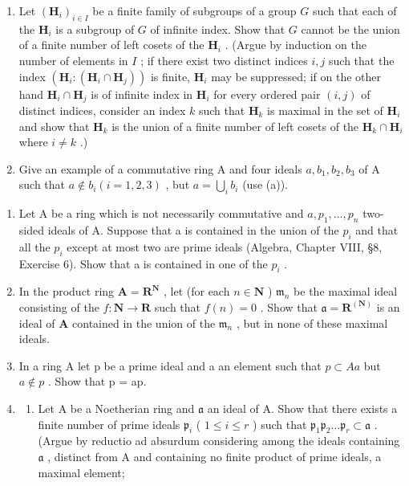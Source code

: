 \begin{enumerate}
\def\labelenumi{(\alph{enumi})}
\setcounter{enumi}{1}
\item
  Let \((\mathbf{H}_i)_{i\in I}\) be a finite family of subgroups of a group \(G\) such that each of the \(\mathbf{H}_i\) is a subgroup of \(G\) of infinite index. Show that \(G\) cannot be the union of a finite number of left cosets of the \(\mathbf{H}_i\) . (Argue by induction on the number of elements in \(I\) ; if there exist two distinct indices \(i,j\) such that the index \((\mathbf{H}_i:(\mathbf{H}_i\cap \mathbf{H}_j))\) is finite, \(\mathbf{H}_i\) may be suppressed; if on the other hand \(\mathbf{H}_i\cap \mathbf{H}_j\) is of infinite index in \(\mathbf{H}_i\) for every ordered pair \((i,j)\) of distinct indices, consider an index \(k\) such that \(\mathbf{H}_k\) is maximal in the set of \(\mathbf{H}_i\) and show that \(\mathbf{H}_k\) is the union of a finite number of left cosets of the \(\mathbf{H}_k\cap \mathbf{H}_i\) where \(i\neq k\) .)
\item
  Give an example of a commutative ring A and four ideals \(a, b_{1}, b_{2}, b_{3}\) of A such that \(a \notin b_{i} (i = 1, 2, 3)\) , but \(a = \bigcup_{i} b_{i}\) (use (a)).
\end{enumerate}

\begin{enumerate}
\def\labelenumi{\arabic{enumi}.}
\setcounter{enumi}{1}
\item
  Let A be a ring which is not necessarily commutative and \(a, p_{1}, \ldots, p_{n}\) two-sided ideals of A. Suppose that a is contained in the union of the \(p_{i}\) and that all the \(p_{i}\) except at most two are prime ideals (Algebra, Chapter VIII, §8, Exercise 6). Show that a is contained in one of the \(p_{i}\) .
\item
  In the product ring \(\mathbf{A} = \mathbf{R}^{\mathbf{N}}\) , let (for each \(n \in \mathbf{N}\) ) \(\mathfrak{m}_n\) be the maximal ideal consisting of the \(f\colon \mathbf{N} \to \mathbf{R}\) such that \(f(n) = 0\) . Show that \(\mathfrak{a} = \mathbf{R}^{(\mathbf{N})}\) is an ideal of \(\mathbf{A}\) contained in the union of the \(\mathfrak{m}_n\) , but in none of these maximal ideals.
\item
  In a ring A let p be a prime ideal and a an element such that \(p \subset Aa\) but \(a \notin p\) . Show that p = ap.
\item
  \begin{enumerate}
  \def\labelenumii{(\alph{enumii})}
  \tightlist
  \item
    Let A be a Noetherian ring and \(\mathfrak{a}\) an ideal of A. Show that there exists a finite number of prime ideals \(\mathfrak{p}_i\) ( \(1 \leqslant i \leqslant r\) ) such that \(\mathfrak{p}_1\mathfrak{p}_2 \ldots \mathfrak{p}_r \subset \mathfrak{a}\) . (Argue by reductio ad absurdum considering among the ideals containing \(\mathfrak{a}\) , distinct from A and containing no finite product of prime ideals, a maximal element;
  \end{enumerate}
\end{enumerate}

